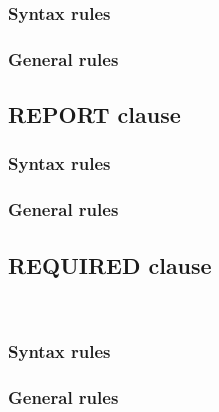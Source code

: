 \subsubsection{Syntax rules}

\subsubsection{General rules}

\subsection{REPORT clause}

\begin{syntax}
\end{syntax}

\subsubsection{Syntax rules}

\subsubsection{General rules}

\subsection{REQUIRED clause}

\begin{syntax}
  \begin{1=}
     \\
  \end{1=}
\end{syntax}

\subsubsection{Syntax rules}

\subsubsection{General rules}

